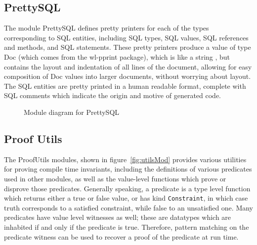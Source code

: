\subsection{PrettySQL}

The module PrettySQL defines pretty printers for each of the types
corresponding to SQL entities, including SQL types, SQL values, SQL references
and methods, and SQL statements. These pretty printers produce a value of
type Doc (which comes from the wl-pprint package), which is like a string
, but contains the layout and indentation of all lines of the document,
allowing for easy composition of Doc values into larger documents, without
worrying about layout. The SQL entities are pretty printed in a human
readable format, complete with SQL comments which indicate the origin
and motive of generated code. 


\begin{figure}[!ht]
    \caption{Module diagram for PrettySQL} 
        \label{fig:prettySQL}
    \end{figure}

\subsection{Proof Utils}

The ProofUtils modules, shown in 
figure~\ref{fig:utilsMod} provides various
utilities for proving compile time invariants, 
including the definitions of
various predicates used in other modules, as well as 
the value-level functions
which prove or disprove those predicates. Generally 
speaking, a predicate is a
type level function which returns either a true or 
false value, or has kind
\lstinline{Constraint}, in which case truth corresponds 
to a satisfied
constraint, while false to an unsatisfied one. Many 
predicates have value level
witnesses as well; these are datatypes which are 
inhabited if and only if the
predicate is true.  Therefore, pattern matching on the 
predicate witness can be used to recover a proof of the predicate at run time.

